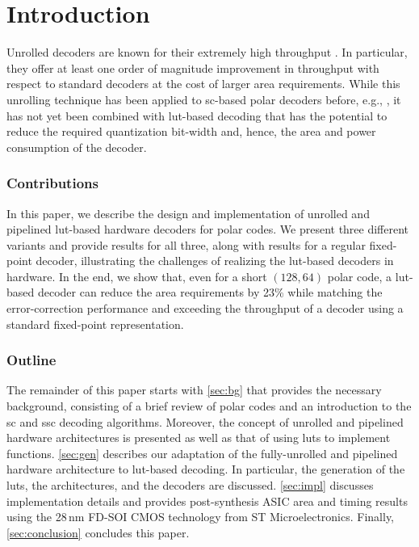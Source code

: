 \documentclass[conference,letterpaper]{IEEEtran}
\begin{document}
\glsresetall

\section{Introduction}\label{sec:intro}
Unrolled decoders are known for their extremely high throughput \cite{Schlafer2013,Balatsoukas-Stimming2015,Giard_TCASI_2016,Giard_JETCAS_2017}. In particular, they offer at least one order of magnitude improvement in throughput with respect to standard decoders at the cost of larger area requirements. While this unrolling technique has been applied to \gls{sc}-based polar decoders before, e.g., \cite{Giard_TCASI_2016,Giard_JETCAS_2017}, it has not yet been combined with \gls{lut}-based decoding that has the potential to reduce the required quantization bit-width and, hence, the area and power consumption of the decoder.

\subsubsection*{Contributions}
In this paper, we describe the design and implementation of unrolled and pipelined \gls{lut}-based hardware decoders for polar codes. We present three different variants and provide results for all three, along with results for a regular fixed-point decoder, illustrating the challenges of realizing the \gls{lut}-based decoders in hardware. In the end, we show that, even for a short $(128, 64)$ polar code, a \gls{lut}-based decoder can reduce the area requirements by 23\% while matching the error-correction performance and exceeding the throughput of a decoder using a standard fixed-point representation.


\subsubsection*{Outline} 
The remainder of this paper starts with \autoref{sec:bg} that provides the necessary background, consisting of a brief review of polar codes and an introduction to the \gls{sc} and \gls{ssc} decoding algorithms. Moreover, the concept of unrolled and pipelined hardware architectures is presented as well as that of using \glspl{lut} to implement functions. \autoref{sec:gen} describes our adaptation of the fully-unrolled and pipelined hardware architecture to \gls{lut}-based decoding. In particular, the generation of the \glspl{lut}, the architectures, and the decoders are discussed. \autoref{sec:impl} discusses implementation details and provides post-synthesis ASIC area and timing results using the 28\,nm FD-SOI CMOS technology from ST Microelectronics. 
Finally, \autoref{sec:conclusion} concludes this paper.
\end{document}
